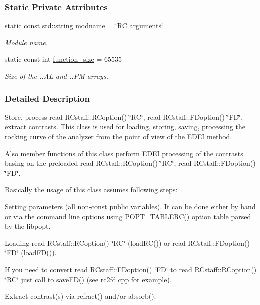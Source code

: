 \subsubsection*{Static Private Attributes}
\begin{DoxyCompactItemize}
\item 
static const std::string \hyperlink{group__edeiedei_ga32645490331f1049ac7b8be12b72e9fd}{modname} = \char`\"{}RC arguments\char`\"{}
\begin{DoxyCompactList}\small\item\em Module name. \item\end{DoxyCompactList}\item 
static const int \hyperlink{classEDEIprocess_a5261e1cab3a15f020b86594303f2c28c}{function\_\-size} = 65535
\begin{DoxyCompactList}\small\item\em Size of the ::AL and ::PM arrays. \item\end{DoxyCompactList}\end{DoxyCompactItemize}


\subsubsection{Detailed Description}
Store, process read RCstaff::RCoption() \char`\"{}RC\char`\"{}, read RCstaff::FDoption() \char`\"{}FD\char`\"{}, extract contrasts. This class is used for loading, storing, saving, processing the rocking curve of the analyzer from the point of view of the EDEI method.

Also member functions of this class perform EDEI processing of the contrasts basing on the preloaded read RCstaff::RCoption() \char`\"{}RC\char`\"{}, read RCstaff::FDoption() \char`\"{}FD\char`\"{}.

Basically the usage of this class assumes following steps:
\begin{DoxyItemize}
\item Setting parameters (all non-\/const public variables). It can be done either by hand or via the command line options using POPT\_\-TABLERC() option table parsed by the libpopt.
\item Loading read RCstaff::RCoption() \char`\"{}RC\char`\"{} (loadRC()) or read RCstaff::FDoption() \char`\"{}FD\char`\"{} (loadFD()).
\item If you need to convert read RCstaff::FDoption() \char`\"{}FD\char`\"{} to read RCstaff::RCoption() \char`\"{}RC\char`\"{} just call to saveFD() (see \hyperlink{rc2fd_8cpp}{rc2fd.cpp} for example).
\item Extract contrast(s) via refract() and/or absorb(). 
\end{DoxyItemize}

